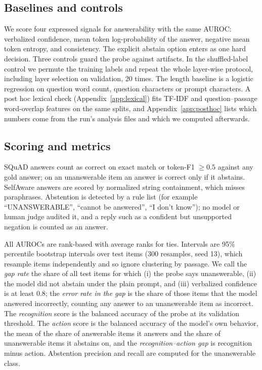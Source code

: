\documentclass[10pt]{article}
\begin{document}
\subsection{Baselines and controls}
We score four expressed signals for answerability with the same AUROC: verbalized confidence, mean token log-probability of the answer, negative mean token entropy, and consistency. The explicit abstain option enters as one hard decision. Three controls guard the probe against artifacts. In the shuffled-label control we permute the training labels and repeat the whole layer-wise protocol, including layer selection on validation, 20 times. The length baseline is a logistic regression on question word count, question characters or prompt characters. A post hoc lexical check (Appendix~\ref{app:lexical}) fits TF-IDF and question--passage word-overlap features on the same splits, and Appendix~\ref{app:posthoc} lists which numbers come from the run's analysis files and which we computed afterwards.

\subsection{Scoring and metrics}\label{sec:metrics}
SQuAD answers count as correct on exact match or token-F1 $\geq 0.5$ against any gold answer; on an unanswerable item an answer is correct only if it abstains. SelfAware answers are scored by normalized string containment, which misses paraphrases. Abstention is detected by a rule list (for example ``UNANSWERABLE'', ``cannot be answered'', ``I don't know''); no model or human judge audited it, and a reply such as a confident but unsupported negation is counted as an answer.

All AUROCs are rank-based with average ranks for ties. Intervals are 95\% percentile bootstrap intervals over test items (300 resamples, seed 13), which resample items independently and so ignore clustering by passage. We call the \emph{gap rate} the share of all test items for which (i) the probe says unanswerable, (ii) the model did not abstain under the plain prompt, and (iii) verbalized confidence is at least 0.8; the \emph{error rate in the gap} is the share of those items that the model answered incorrectly, counting any answer to an unanswerable item as incorrect. The \emph{recognition} score is the balanced accuracy of the probe at its validation threshold. The \emph{action} score is the balanced accuracy of the model's own behavior, the mean of the share of answerable items it answers and the share of unanswerable items it abstains on, and the \emph{recognition--action gap} is recognition minus action. Abstention precision and recall are computed for the unanswerable class.
\end{document}
